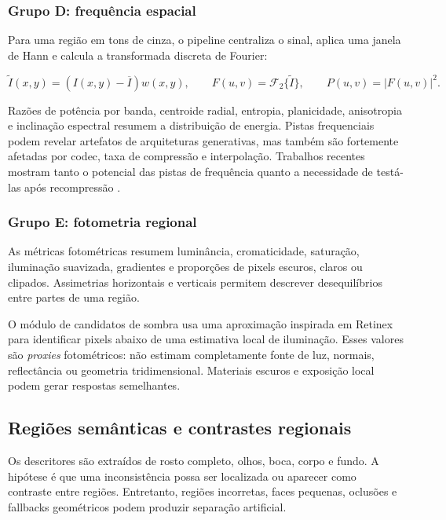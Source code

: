 \documentclass[11pt,a4paper]{article}
\begin{document}
\subsubsection{Grupo D: frequência espacial}

Para uma região em tons de cinza, o pipeline centraliza o sinal, aplica uma
janela de Hann e calcula a transformada discreta de Fourier:

\begin{equation}
  \widetilde{I}(x,y)=(I(x,y)-\overline{I})w(x,y),
  \qquad
  F(u,v)=\mathcal{F}_{2}\{\widetilde{I}\},
  \qquad
  P(u,v)=|F(u,v)|^2.
\end{equation}

Razões de potência por banda, centroide radial, entropia, planicidade,
anisotropia e inclinação espectral resumem a distribuição de energia. Pistas
frequenciais podem revelar artefatos de arquiteturas generativas, mas também
são fortemente afetadas por codec, taxa de compressão e interpolação. Trabalhos
recentes mostram tanto o potencial das pistas de frequência quanto a necessidade
de testá-las após recompressão \cite{corvi2025seeing,michels2026biases}.

\subsubsection{Grupo E: fotometria regional}

As métricas fotométricas resumem luminância, cromaticidade, saturação,
iluminação suavizada, gradientes e proporções de pixels escuros, claros ou
clipados. Assimetrias horizontais e verticais permitem descrever desequilíbrios
entre partes de uma região.

O módulo de candidatos de sombra usa uma aproximação inspirada em Retinex para
identificar pixels abaixo de uma estimativa local de iluminação. Esses valores
são \emph{proxies} fotométricos: não estimam completamente fonte de luz,
normais, reflectância ou geometria tridimensional. Materiais escuros e exposição
local podem gerar respostas semelhantes.

\subsection{Regiões semânticas e contrastes regionais}

Os descritores são extraídos de rosto completo, olhos, boca, corpo e fundo. A
hipótese é que uma inconsistência possa ser localizada ou aparecer como
contraste entre regiões. Entretanto, regiões incorretas, faces pequenas,
oclusões e fallbacks geométricos podem produzir separação artificial.
\end{document}
